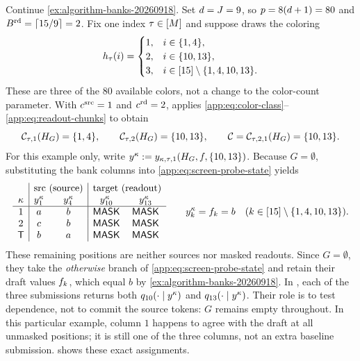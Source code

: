 \begin{example}
\label{ex:algorithm-submissions-20260918}
Continue \cref{ex:algorithm-banks-20260918}.  Set
$\DegreeCutoff=\ChunkCount=9$, so
$\ColorCount=8(\DegreeCutoff+1)=80$ and
$\ReadoutChunkSize=\lceil15/9\rceil=2$.
Fix one index $\tau\in[\ColoringCount]$ and suppose 
draws the coloring
\[
 \ColorHash{\tau}{i}=
 \begin{cases}
 1,&i\in\{1,4\},\\
 2,&i\in\{10,13\},\\
 3,&i\in[15]\setminus\{1,4,10,13\}.
 \end{cases}
\]
These are three of the $80$ available colors, not a change to the
color-count parameter.  With
$\SourceColorValue=1$ and $\ReadoutColorValue=2$, 
applies \eqref{app:eq:color-class}--\eqref{app:eq:readout-chunks} to obtain
\[
 \ColorClass{\tau}{1}=\{1,4\},\qquad
 \ColorClass{\tau}{2}=\{10,13\},\qquad
 \mathcal C=\ReadoutChunk{\tau}{2}{1}=\{10,13\}.
\]
For this example only, write
$y^\kappa:=\ProbeState{\kappa}{\tau}{1}{\{10,13\}}$.
Because $G=\emptyset$, substituting the bank columns into
\eqref{app:eq:screen-probe-state} yields
\[
\begin{array}{c|cc|cc}
 &\multicolumn{2}{c|}{\text{src (source)}}
 &\multicolumn{2}{c}{\text{target (readout)}}\\
 \kappa&y^\kappa_1&y^\kappa_4&y^\kappa_{10}&y^\kappa_{13}\\ \hline
 1&a&b&\MASK&\MASK\\
 2&c&b&\MASK&\MASK\\
 \TailColumn&b&a&\MASK&\MASK
\end{array}
 \qquad
 y^\kappa_k=\DraftToken{k}=b
 \quad(k\in[15]\setminus\{1,4,10,13\}).
\]
These remaining positions are neither sources nor masked readouts.
Since $G=\emptyset$, they take the \emph{otherwise} branch of
\eqref{app:eq:screen-probe-state} and retain their draft values
$\DraftToken{k}$, which equal $b$ by \cref{ex:algorithm-banks-20260918}.
In , each of the three submissions returns both
$\OracleRow{y^\kappa}{10}$ and $\OracleRow{y^\kappa}{13}$.
Their role is to test dependence, not to commit the source tokens:
$G$ remains empty throughout.  In this particular example, column $1$
happens to agree with the draft at all unmasked positions; it is still
one of the three columns, not an extra baseline submission.
 shows these exact assignments.
\end{example}

